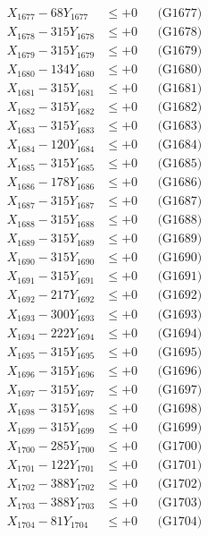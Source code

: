 \documentclass[a4paper,10pt]{article}
\begin{document}
{\begin{align}
X_{1677} - 68Y_{1677} &\leq +0 && \text{(G1677)} \\
X_{1678} - 315Y_{1678} &\leq +0 && \text{(G1678)} \\
X_{1679} - 315Y_{1679} &\leq +0 && \text{(G1679)} \\
X_{1680} - 134Y_{1680} &\leq +0 && \text{(G1680)} \\
\allowbreak
X_{1681} - 315Y_{1681} &\leq +0 && \text{(G1681)} \\
X_{1682} - 315Y_{1682} &\leq +0 && \text{(G1682)} \\
X_{1683} - 315Y_{1683} &\leq +0 && \text{(G1683)} \\
X_{1684} - 120Y_{1684} &\leq +0 && \text{(G1684)} \\
X_{1685} - 315Y_{1685} &\leq +0 && \text{(G1685)} \\
X_{1686} - 178Y_{1686} &\leq +0 && \text{(G1686)} \\
X_{1687} - 315Y_{1687} &\leq +0 && \text{(G1687)} \\
X_{1688} - 315Y_{1688} &\leq +0 && \text{(G1688)} \\
X_{1689} - 315Y_{1689} &\leq +0 && \text{(G1689)} \\
X_{1690} - 315Y_{1690} &\leq +0 && \text{(G1690)} \\
\allowbreak
X_{1691} - 315Y_{1691} &\leq +0 && \text{(G1691)} \\
X_{1692} - 217Y_{1692} &\leq +0 && \text{(G1692)} \\
X_{1693} - 300Y_{1693} &\leq +0 && \text{(G1693)} \\
X_{1694} - 222Y_{1694} &\leq +0 && \text{(G1694)} \\
X_{1695} - 315Y_{1695} &\leq +0 && \text{(G1695)} \\
X_{1696} - 315Y_{1696} &\leq +0 && \text{(G1696)} \\
X_{1697} - 315Y_{1697} &\leq +0 && \text{(G1697)} \\
X_{1698} - 315Y_{1698} &\leq +0 && \text{(G1698)} \\
X_{1699} - 315Y_{1699} &\leq +0 && \text{(G1699)} \\
X_{1700} - 285Y_{1700} &\leq +0 && \text{(G1700)} \\
\allowbreak
X_{1701} - 122Y_{1701} &\leq +0 && \text{(G1701)} \\
X_{1702} - 388Y_{1702} &\leq +0 && \text{(G1702)} \\
X_{1703} - 388Y_{1703} &\leq +0 && \text{(G1703)} \\
X_{1704} - 81Y_{1704} &\leq +0 && \text{(G1704)} \\

\end{align}}
\end{document}
